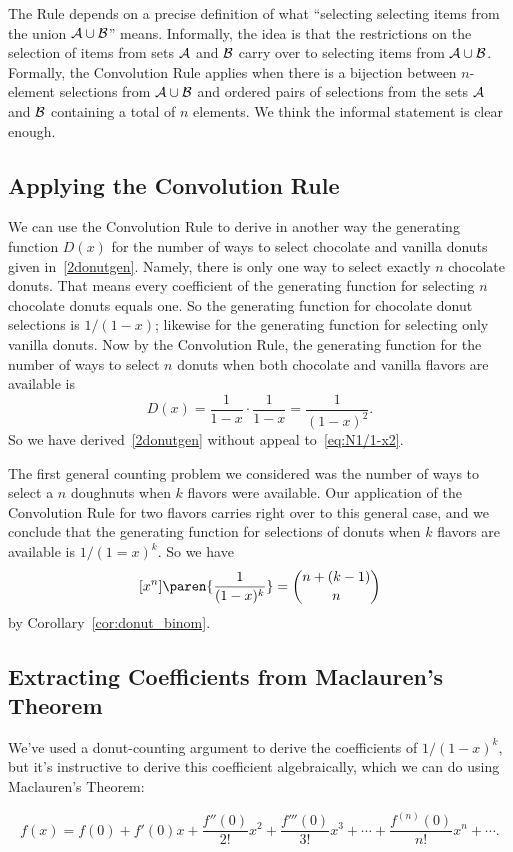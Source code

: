 The Rule depends on a precise definition of what ``selecting selecting
items from the union ${\cal A} \cup {\cal B}$'' means.  Informally,
the idea is that the restrictions on the selection of items from sets
${\cal A}$ and ${\cal B}$ carry over to selecting items from ${\cal A}
\cup {\cal B}$.  Formally, the Convolution Rule applies when there is
a bijection between $n$-element selections from ${\cal A} \cup {\cal
  B}$ and ordered pairs of selections from the sets ${\cal A}$ and
${\cal B}$ containing a total of $n$ elements.  We think the informal
statement is clear enough.

\subsection{Applying the Convolution Rule}

We can use the Convolution Rule to derive in another way the
generating function $D(x)$ for the number of ways to select chocolate
and vanilla donuts given in~\eqref{2donutgen}.  Namely, there is only
one way to select exactly $n$ chocolate donuts.  That means every
coefficient of the generating function for selecting $n$ chocolate
donuts equals one.  So the generating function for chocolate donut
selections is $1/(1-x)$; likewise for the generating function for
selecting only vanilla donuts.  Now by the Convolution Rule, the
generating function for the number of ways to select $n$ donuts when
both chocolate and vanilla flavors are available is
\[
D(x) = \frac{1}{1-x} \cdot \frac{1}{1-x} = \frac{1}{(1-x)^2}.
\]
So we have derived~\eqref{2donutgen} without appeal
to~\eqref{eq:N1/1-x2}.

The first general counting problem we considered was the number of
ways to select a $n$ doughnuts when $k$ flavors were available.  Our
application of the Convolution Rule for two flavors carries right over
to this general case, and we conclude that the generating function for
selections of donuts when $k$ flavors are available is $1/(1=x)^k$.
So we have
\begin{equation}\label{eq:donut_coefficient}
[x^n]\paren{\frac{1}{(1-x)^k}} = \binom{n+(k-1)}{n}
\end{equation}
by Corollary~\ref{cor:donut_binom}.

\subsection{Extracting Coefficients from Maclauren's Theorem}

We've used a donut-counting argument to derive the coefficients of
$1/(1-x)^k$, but it's instructive to derive this coefficient
algebraically, which we can do using Maclauren's Theorem:
\begin{theorem}
\[
f(x) = f(0) + f'(0) x + \frac{f''(0)}{2!} x^2 + \frac{f'''(0)}{3!} x^3 + \cdots
+ \frac{f^{(n)}(0)}{n!} x^n + \cdots.
\]
\end{theorem}

